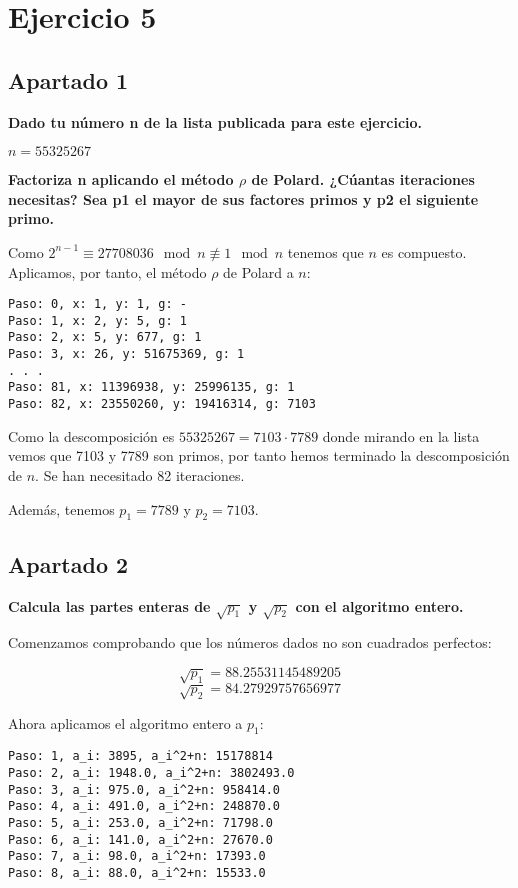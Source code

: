\documentclass[a4paper]{article}
\title {\fbox{\Huge{\textbf{Ejercicio 5}}}}
\author {\fbox{Ana Buendía Ruiz-Azuaga}}
\begin{document}
\maketitle


\section{Ejercicio 5}

\subsection{Apartado 1}

\textbf{Dado tu número n de la lista publicada para este ejercicio.}

$n = 55325267$

\textbf{Factoriza n aplicando el método $\rho$ de Polard. ¿Cúantas iteraciones necesitas? Sea p1 el mayor de sus factores primos y p2 el siguiente primo.}

Como $2^{n-1}\equiv 27708036 \mod n \not\equiv 1\mod n$ tenemos que $n$ es compuesto. Aplicamos, por tanto, el método $\rho$ de Polard a $n$:

\begin{verbatim}
Paso: 0, x: 1, y: 1, g: -
Paso: 1, x: 2, y: 5, g: 1
Paso: 2, x: 5, y: 677, g: 1
Paso: 3, x: 26, y: 51675369, g: 1
. . .
Paso: 81, x: 11396938, y: 25996135, g: 1
Paso: 82, x: 23550260, y: 19416314, g: 7103
\end{verbatim}

Como la descomposición es $55325267= 7103 \cdot 7789$ donde mirando en la lista vemos que 7103 y 7789 son primos, por tanto hemos terminado la descomposición de $n$. Se han necesitado 82 iteraciones.

Además, tenemos $p_1=7789$ y $p_2=7103$.

\subsection{Apartado 2}
\textbf{Calcula las partes enteras de $\sqrt{p_1}$ y $\sqrt{p_2}$ con el algoritmo entero.}

Comenzamos comprobando que los números dados no son cuadrados perfectos:

$$\sqrt{p_1} = 88.25531145489205$$
$$\sqrt{p_2} = 84.27929757656977$$

Ahora aplicamos el algoritmo entero a $p_1$:

\begin{verbatim}
Paso: 1, a_i: 3895, a_i^2+n: 15178814
Paso: 2, a_i: 1948.0, a_i^2+n: 3802493.0
Paso: 3, a_i: 975.0, a_i^2+n: 958414.0
Paso: 4, a_i: 491.0, a_i^2+n: 248870.0
Paso: 5, a_i: 253.0, a_i^2+n: 71798.0
Paso: 6, a_i: 141.0, a_i^2+n: 27670.0
Paso: 7, a_i: 98.0, a_i^2+n: 17393.0
Paso: 8, a_i: 88.0, a_i^2+n: 15533.0
\end{verbatim}
\end{document}
